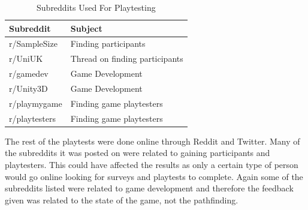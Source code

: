 \documentclass[journal]{IEEEtran}
\begin{document}
	\begin{table}[H]
		\centering
		\caption{Subreddits Used For Playtesting}
		\label{table:Subreddits}
		\def\arraystretch{1.5}
		\begin{tabular}{ |l|l|}
			\hline
			\textbf{Subreddit}    	& \textbf{Subject} \\     \hline
			r/SampleSize        	& Finding participants  \\ \hline
			r/UniUK             	& Thread on finding participants \\ \hline
			r/gamedev             	& Game Development \\ \hline
			r/Unity3D             	& Game Development \\ \hline
			r/playmygame         	& Finding game playtesters \\ \hline
			r/playtesters         	& Finding game playtesters \\ \hline
		\end{tabular}
	\end{table}
	
	The rest of the playtests were done online through Reddit and Twitter. Many of the subreddits it was posted on were related to gaining participants and playtesters. This could have affected the results as only a certain type of person would go online looking for surveys and playtests to complete. Again some of the subreddits listed were related to game development and therefore the feedback given was related to the state of the game, not the pathfinding.     
	
	
\end{document}

